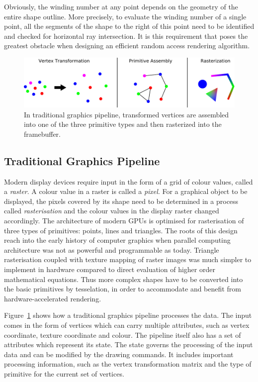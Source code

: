 \documentclass[11pt,a4paper,twoside]{article}
\begin{document}
Obviously, the winding number at any point depends on the geometry of the entire shape outline. More precisely, to evaluate the winding number of a single point, all the segments of the shape to the right of this point need to be identified and checked for horizontal ray intersection. It is this requirement that poses the greatest obstacle when designing an efficient random access rendering algorithm.

\begin {figure}
	\centering
	\includegraphics [width=1.0\columnwidth]{figures/gfx_pipeline}
	\caption {In traditional graphics pipeline, transformed vertices are assembled into one of the three primitive types and then rasterized into the framebuffer.}
	\label {fig:gfx_pipeline}
\end {figure}

\subsection{Traditional Graphics Pipeline}

Modern display devices require input in the form of a grid of colour values, called a \emph{raster}. A colour value in a raster is called a \emph{pixel}. For a graphical object to be displayed, the pixels covered by its shape need to be determined in a process called \emph{rasterisation} and the colour values in the display raster changed accordingly. The architecture of modern GPUs is optimised for rasterisation of three types of primitives: points, lines and triangles. The roots of this design reach into the early history of computer graphics when parallel computing architecture was not as powerful and programmable as today. Triangle rasterisation coupled with texture mapping of raster images was much simpler to implement in hardware compared to direct evaluation of higher order mathematical equations. Thus more complex shapes have to be converted into the basic primitives by tesselation, in order to accommodate and benefit from hardware-accelerated rendering.

Figure~\ref{fig:gfx_pipeline} shows how a traditional graphics pipeline processes the data. The input comes in the form of vertices which can carry multiple attributes, such as vertex coordinate, texture coordinate and colour. The pipeline itself also has a set of attributes which represent its state. The state governs the processing of the input data and can be modified by the drawing commands. It includes important processing information, such as the vertex transformation matrix and the type of primitive for the current set of vertices.
\end{document}

